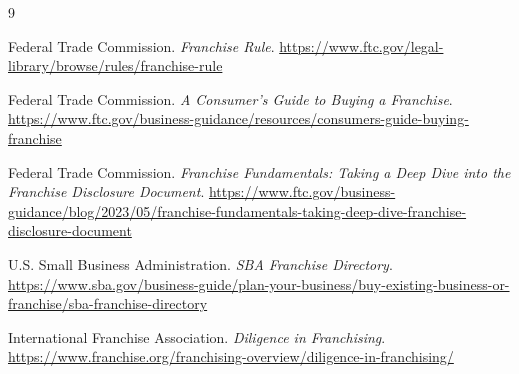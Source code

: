 \documentclass[11pt]{article}
\begin{document}
\renewcommand{\refname}{\color{accent}References}
\begin{thebibliography}{9}

Federal Trade Commission.
\textit{Franchise Rule}.
\url{https://www.ftc.gov/legal-library/browse/rules/franchise-rule}

Federal Trade Commission.
\textit{A Consumer's Guide to Buying a Franchise}.
\url{https://www.ftc.gov/business-guidance/resources/consumers-guide-buying-franchise}

Federal Trade Commission.
\textit{Franchise Fundamentals: Taking a Deep Dive into the Franchise Disclosure Document}.
\url{https://www.ftc.gov/business-guidance/blog/2023/05/franchise-fundamentals-taking-deep-dive-franchise-disclosure-document}

U.S. Small Business Administration.
\textit{SBA Franchise Directory}.
\url{https://www.sba.gov/business-guide/plan-your-business/buy-existing-business-or-franchise/sba-franchise-directory}

International Franchise Association.
\textit{Diligence in Franchising}.
\url{https://www.franchise.org/franchising-overview/diligence-in-franchising/}

\end{thebibliography}
\end{document}
